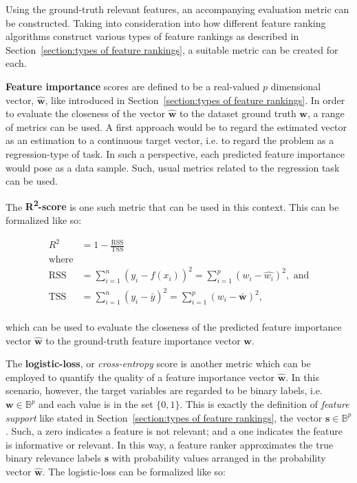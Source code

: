 \documentclass{article}
\begin{document}
Using the ground-truth relevant features, an accompanying evaluation metric can be constructed. Taking into consideration into how different feature ranking algorithms construct various types of feature rankings as described in Section~\ref{section:types of feature rankings}, a suitable metric can be created for each.

\textbf{Feature importance} scores are defined to be a real-valued $p$ dimensional vector, $\hat{\boldsymbol{w}}$, like introduced in Section~\ref{section:types of feature rankings}. In order to evaluate the closeness of the vector $\hat{\boldsymbol{w}}$ to the dataset ground truth $\boldsymbol{w}$, a range of metrics can be used. A first approach would be to regard the estimated vector as an estimation to a continuous target vector, i.e. to regard the problem as a regression-type of task. In such a perspective, each predicted feature importance would pose as a data sample. Such, usual metrics related to the regression task can be used.

The \textbf{R\textsuperscript{2}-score} is one such metric that can be used in this context. This can be formalized like so:

\begin{equation}
\begin{aligned}
R^{2}&=1-\frac{\mathrm{RSS}}{\mathrm{TSS}} \\
\text{where}&\\
\mathrm{RSS} &= \sum_{i=1}^{n}\left(y_{i}-f\left(x_{i}\right)\right)^{2} =\sum_{i=1}^{p}\left(w_i - \hat{w_i} \right)^{2}, \text{ and}\\
\mathrm{TSS} &= \sum_{i=1}^{n}\left(y_{i}-\bar{y}\right)^{2} =\sum_{i=1}^{p}\left( w_i - \bar{\boldsymbol{w}} \right)^{2}, \\
\end{aligned}
\end{equation}

which can be used to evaluate the closeness of the predicted feature importance vector $\hat{\boldsymbol{w}}$ to the ground-truth feature importance vector $\boldsymbol{w}$.

The \textbf{logistic-loss}, or \textit{cross-entropy} score is another metric which can be employed to quantify the quality of a feature importance vector $\hat{\boldsymbol{w}}$. In this scenario, however, the target variables are regarded to be binary labels, i.e. $\boldsymbol{w} \in \mathbb{B}^p$ and each value is in the set $\{0, 1\}$. This is exactly the definition of \textit{feature support} like stated in Section~\ref{section:types of feature rankings}, the vector $\boldsymbol{s} \in \mathbb{B}^p$. Such, a zero indicates a feature is not relevant; and a one indicates the feature is informative or relevant. In this way, a feature ranker approximates the true binary relevance labels $\boldsymbol{s}$ with probability values arranged in the probability vector $\hat{\boldsymbol{w}}$. The logistic-loss can be formalized like so:
\end{document}
